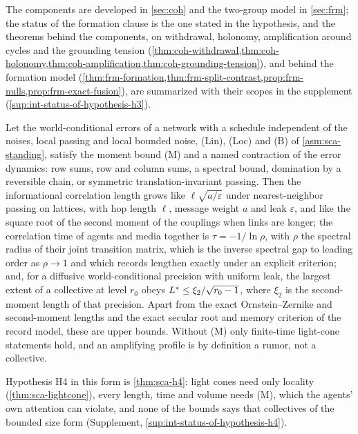 
The components are developed in \cref{sec:coh} and the two-group model in \cref{sec:frm}; the status of the formation clause is the one stated in the hypothesis, and the theorems behind the components, on withdrawal, holonomy, amplification around cycles and the grounding tension (\cref{thm:coh-withdrawal,thm:coh-holonomy,thm:coh-amplification,thm:coh-grounding-tension}), and behind the formation model (\cref{thm:frm-formation,thm:frm-split-contrast,prop:frm-nulls,prop:frm-exact-fusion}), are summarized with their scopes in the supplement (\cref{sup:int-status-of-hypothesis-h3}).

\begin{hypothesis}[Scale]\label{hyp:int-h4}
Let the world-conditional errors of a network with a schedule independent of the noises, local passing and local bounded noise, (Lin), (Loc) and (B) of \cref{asm:sca-standing}, satisfy the moment bound (M) and a named contraction of the error dynamics: row sums, row and column sums, a spectral bound, domination by a reversible chain, or symmetric translation-invariant passing. Then the informational correlation length grows like $\ell\sqrt{a/\varepsilon}$ under nearest-neighbor passing on lattices, with hop length $\ell$, message weight $a$ and leak $\varepsilon$, and like the square root of the second moment of the couplings when links are longer; the correlation time of agents and media together is $\tau=-1/\ln\rho$, with $\rho$ the spectral radius of their joint transition matrix, which is the inverse spectral gap to leading order as $\rho\to1$ and which records lengthen exactly under an explicit criterion; and, for a diffusive world-conditional precision with uniform leak, the largest extent of a collective at level $r_0$ obeys $L^{\ast}\le\xi_2/\sqrt{r_0-1}$, where $\xi_2$ is the second-moment length of that precision. Apart from the exact Ornstein--Zernike and second-moment lengths and the exact secular root and memory criterion of the record model, these are upper bounds. Without (M) only finite-time light-cone statements hold, and an amplifying profile is by definition a rumor, not a collective.
\end{hypothesis}

Hypothesis H4 in this form is \cref{thm:sca-h4}: light cones need only locality (\cref{thm:sca-lightcone}), every length, time and volume needs (M), which the agents' own attention can violate, and none of the bounds says that collectives of the bounded size form (Supplement, \cref{sup:int-status-of-hypothesis-h4}).

